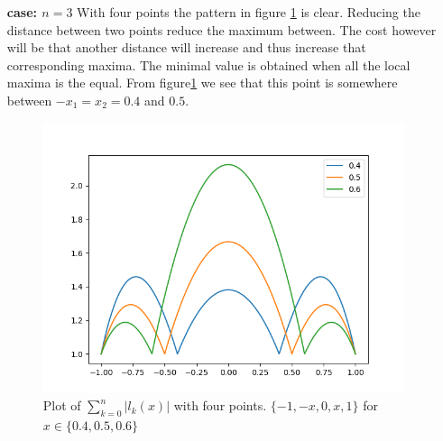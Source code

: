 \begin{solution}
\begin{enumerate}
  \item[{\bf case: $n=3$}] With four points the pattern in figure \ref{fig:4n3} is clear. Reducing the distance between two points
    reduce the maximum between. The cost however will be that another
    distance will increase and thus increase that corresponding
    maxima. The minimal value is obtained when all the local maxima is
    the    equal. From figure\ref{fig:4n3} we see that this point is
    somewhere between $-x_1 = x_2 = 0.4$ and $0.5$. 
    \begin{figure}[!ht]
      \centering
      \includegraphics[scale = 0.5]{code/task_4_n3.png}
      \caption{Plot of $\sum_{k=0}^n|l_k(x)|$ with four
        points. $\{-1, -x, 0, x, 1\}$ for $x \in \{0.4, 0.5, 0.6\}$}
      \label{fig:4n3}
    \end{figure}
  \end{enumerate}
\end{solution}

